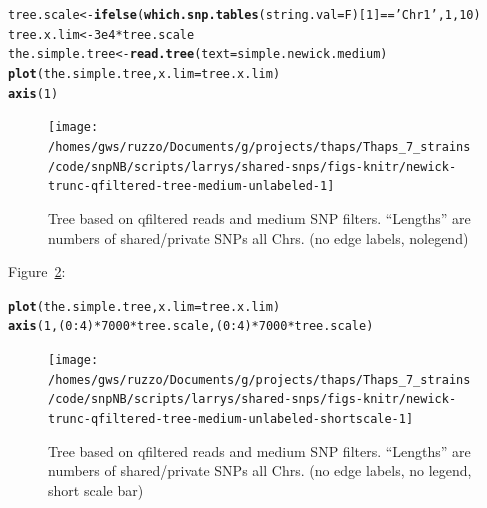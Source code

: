 \documentclass{article}\usepackage[]{graphicx}\usepackage[]{color}
\makeatletter
\newcommand{\hlnum}[1]{\textcolor[rgb]{0.686,0.059,0.569}{#1}}%
\newcommand{\hlstr}[1]{\textcolor[rgb]{0.192,0.494,0.8}{#1}}%
\newcommand{\hlopt}[1]{\textcolor[rgb]{0,0,0}{#1}}%
\newcommand{\hlstd}[1]{\textcolor[rgb]{0.345,0.345,0.345}{#1}}%
\newcommand{\hlkwb}[1]{\textcolor[rgb]{0.69,0.353,0.396}{#1}}%
\newcommand{\hlkwc}[1]{\textcolor[rgb]{0.333,0.667,0.333}{#1}}%
\newcommand{\hlkwd}[1]{\textcolor[rgb]{0.737,0.353,0.396}{\textbf{#1}}}%
\newenvironment{kframe}{%
 \def\at@end@of@kframe{}%
 \ifinner\ifhmode%
  \def\at@end@of@kframe{\end{minipage}}%
  \begin{minipage}{\columnwidth}%
 \fi\fi%
 \def\FrameCommand##1{\hskip\@totalleftmargin \hskip-\fboxsep
 \colorbox{shadecolor}{##1}\hskip-\fboxsep
     \hskip-\linewidth \hskip-\@totalleftmargin \hskip\columnwidth}%
 \MakeFramed {\advance\hsize-\width
   \@totalleftmargin\z@ \linewidth\hsize
   \@setminipage}}%
 {\par\unskip\endMakeFramed%
 \at@end@of@kframe}
\newenvironment{knitrout}{}{} %
\makeatother
\begin{document}
\begin{knitrout}\scriptsize
{}\color{fgcolor}\begin{kframe}
\begin{alltt}
\hlstd{tree.scale} \hlkwb{<-} \hlkwd{ifelse}\hlstd{(}\hlkwd{which.snp.tables}\hlstd{(}\hlkwc{string.val}\hlstd{=F)[}\hlnum{1}\hlstd{]}\hlopt{==}\hlstr{'Chr1'}\hlstd{,} \hlnum{1}\hlstd{,} \hlnum{10}\hlstd{)}
\hlstd{tree.x.lim} \hlkwb{<-} \hlnum{3e4} \hlopt{*} \hlstd{tree.scale}
\hlstd{the.simple.tree} \hlkwb{<-} \hlkwd{read.tree}\hlstd{(}\hlkwc{text}\hlstd{=simple.newick.medium)}
\hlkwd{plot}\hlstd{(the.simple.tree,} \hlkwc{x.lim} \hlstd{= tree.x.lim)}
\hlkwd{axis}\hlstd{(}\hlnum{1}\hlstd{)}
\end{alltt}
\end{kframe}\begin{figure}

{\centering \texttt{[image: /homes/gws/ruzzo/Documents/g/projects/thaps/Thaps\_7\_strains/code/snpNB/scripts/larrys/shared-snps/figs-knitr/newick-trunc-qfiltered-tree-medium-unlabeled-1]} 

}

\caption[Tree based on qfiltered reads and medium SNP filters]{Tree based on qfiltered reads and medium SNP filters.  ``Lengths'' are numbers of shared/private SNPs all Chrs. (no edge labels, nolegend)}\label{fig:tree-medium-unlabeled}
\end{figure}


\end{knitrout}

Figure~\ref{fig:tree-medium-unlabeled-shortscale}:

\begin{knitrout}\scriptsize
{}\color{fgcolor}\begin{kframe}
\begin{alltt}
\hlkwd{plot}\hlstd{(the.simple.tree,} \hlkwc{x.lim} \hlstd{= tree.x.lim)}
\hlkwd{axis}\hlstd{(}\hlnum{1}\hlstd{,(}\hlnum{0}\hlopt{:}\hlnum{4}\hlstd{)}\hlopt{*}\hlnum{7000}\hlopt{*}\hlstd{tree.scale,(}\hlnum{0}\hlopt{:}\hlnum{4}\hlstd{)}\hlopt{*}\hlnum{7000}\hlopt{*}\hlstd{tree.scale)}
\end{alltt}
\end{kframe}\begin{figure}

{\centering \texttt{[image: /homes/gws/ruzzo/Documents/g/projects/thaps/Thaps\_7\_strains/code/snpNB/scripts/larrys/shared-snps/figs-knitr/newick-trunc-qfiltered-tree-medium-unlabeled-shortscale-1]} 

}

\caption[Tree based on qfiltered reads and medium SNP filters]{Tree based on qfiltered reads and medium SNP filters.  ``Lengths'' are numbers of shared/private SNPs all Chrs. (no edge labels, no legend, short scale bar)}\label{fig:tree-medium-unlabeled-shortscale}
\end{figure}


\end{knitrout}
\end{document}
